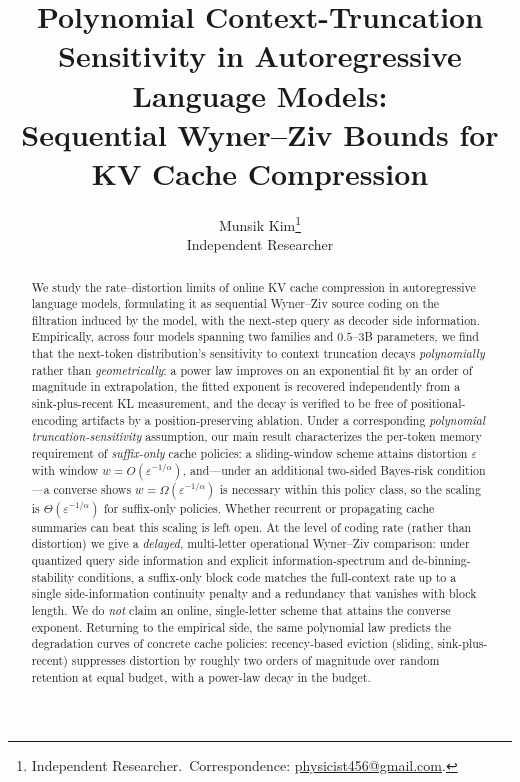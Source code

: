 \documentclass[11pt]{article}
\theoremstyle{plain}
\theoremstyle{definition}
\theoremstyle{remark}
\begin{document}
\title{\bfseries Polynomial Context-Truncation Sensitivity in Autoregressive
Language Models:\\[2pt]
Sequential Wyner--Ziv Bounds for KV Cache Compression}
\author{Munsik Kim\thanks{Independent Researcher.\ Correspondence:
\href{mailto:physicist456@gmail.com}{physicist456@gmail.com}.}\\
Independent Researcher}
\date{}
\maketitle


\begin{abstract}
We study the rate--distortion limits of online KV cache compression
in autoregressive language models, formulating it as sequential
Wyner--Ziv source coding on the filtration induced by the model,
with the next-step query as decoder side information. Empirically,
across four models spanning two families and $0.5$--$3$B parameters,
we find that the next-token distribution's sensitivity to context
truncation decays \emph{polynomially} rather than
\emph{geometrically}: a power law improves on an exponential fit by
an order of magnitude in extrapolation, the fitted exponent is
recovered independently from a sink-plus-recent KL measurement, and
the decay is verified to be free of positional-encoding artifacts by
a position-preserving ablation. Under a corresponding
\emph{polynomial truncation-sensitivity} assumption, our main result
characterizes the per-token memory requirement of \emph{suffix-only}
cache policies: a sliding-window scheme attains distortion
$\varepsilon$ with window $w = O(\varepsilon^{-1/\alpha})$, and---under
an additional two-sided Bayes-risk condition---a converse shows
$w = \Omega(\varepsilon^{-1/\alpha})$ is necessary within this policy
class, so the scaling is $\Theta(\varepsilon^{-1/\alpha})$ for
suffix-only policies. Whether recurrent or propagating cache
summaries can beat this scaling is left open. At the level of coding
rate (rather than distortion) we give a \emph{delayed}, multi-letter
operational Wyner--Ziv comparison: under quantized query side
information and explicit information-spectrum and de-binning-stability
conditions, a suffix-only block code matches the full-context rate up to a single
side-information continuity penalty and a redundancy that vanishes
with block length. We do \emph{not} claim an online, single-letter
scheme that attains the converse exponent. Returning to the empirical
side, the same polynomial law predicts the degradation curves of
concrete cache policies: recency-based eviction (sliding,
sink-plus-recent) suppresses distortion by roughly two orders of
magnitude over random retention at equal budget, with a power-law
decay in the budget.
\end{abstract}
\end{document}
